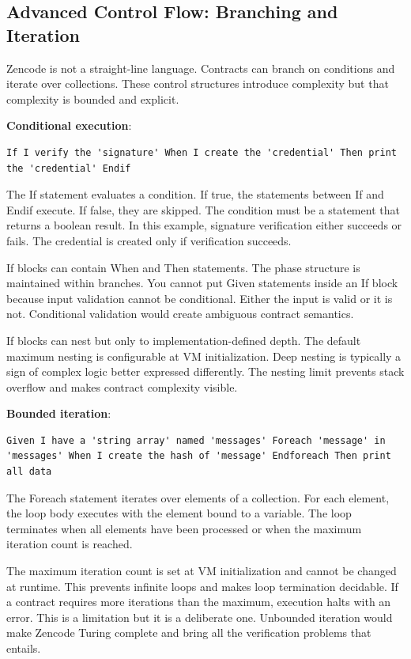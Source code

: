 \subsection{Advanced Control Flow: Branching and Iteration}

Zencode is not a straight-line language. Contracts can branch on
conditions and iterate over collections. These control structures
introduce complexity but that complexity is bounded and explicit.

\textbf{Conditional execution}:

\begin{verbatim}
If I verify the 'signature' When I create the 'credential' Then print
the 'credential' Endif
\end{verbatim}

The If statement evaluates a condition. If true, the statements
between If and Endif execute. If false, they are skipped. The
condition must be a statement that returns a boolean result. In this
example, signature verification either succeeds or fails. The
credential is created only if verification succeeds.

If blocks can contain When and Then statements. The phase structure is
maintained within branches. You cannot put Given statements inside an
If block because input validation cannot be conditional. Either the
input is valid or it is not. Conditional validation would create
ambiguous contract semantics.

If blocks can nest but only to implementation-defined depth. The
default maximum nesting is configurable at VM initialization. Deep
nesting is typically a sign of complex logic better expressed
differently. The nesting limit prevents stack overflow and makes
contract complexity visible.

\textbf{Bounded iteration}:

\begin{verbatim}
Given I have a 'string array' named 'messages' Foreach 'message' in
'messages' When I create the hash of 'message' Endforeach Then print
all data
\end{verbatim}

The Foreach statement iterates over elements of a collection. For each
element, the loop body executes with the element bound to a
variable. The loop terminates when all elements have been processed or
when the maximum iteration count is reached.

The maximum iteration count is set at VM initialization and cannot be
changed at runtime. This prevents infinite loops and makes loop
termination decidable. If a contract requires more iterations than the
maximum, execution halts with an error. This is a limitation but it is
a deliberate one. Unbounded iteration would make Zencode Turing
complete and bring all the verification problems that entails.

